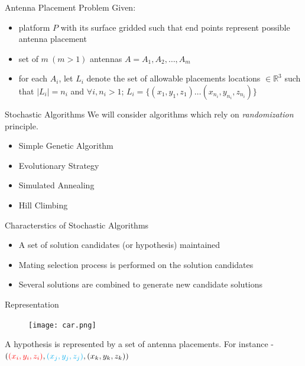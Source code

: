 \documentclass{beamer}
\begin{document}
    \begin{frame}[t]{Antenna Placement Problem}
        Given:
    \begin{itemize} \itemsep1.5em
            \item<1-> platform $P$ with its surface gridded such that end points represent possible antenna placement
            \item<2-> set of  $m~(m > 1)$ antennas $A = {A_1, A_2, \dots, A_m}$
            \item<3-> for each $A_i$, let $L_i$ denote the set of allowable placements locations $\in \mathbb R^3$ such that $\mid L_i \mid = n_i$ and $\forall i, n_i > 1$; $L_i = \{(x_{1}, y_{1}, z_{1}) \dots (x_{n_i}, y_{n_i}, z_{n_i})\}$
        \end{itemize}
        \vspace{10px}
        \centering{}
    \end{frame}

    \begin{frame}[t]{Stochastic Algorithms}
        We will consider algorithms which rely on \textit{randomization} principle.
        \vspace{10px}
    \begin{itemize} \itemsep1.5em
            \item Simple Genetic Algorithm
            \item Evolutionary Strategy
            \item Simulated Annealing
            \item Hill Climbing
        \end{itemize}
    \end{frame}

    \begin{frame}[t]{Characterstics of Stochastic Algorithms}
    \begin{itemize} \itemsep1.5em
            \item A set of solution candidates (or hypothesis) maintained
            \item Mating selection process is performed on the solution candidates
            \item Several solutions are combined to generate new candidate solutions
        \end{itemize}
    \end{frame}



    \begin{frame}[t]{Representation}
        \begin{figure}
            \centering
            \texttt{[image: car.png]}
        \end{figure}
        A hypothesis is represented by a set of antenna placements. For instance - $(\textcolor{red}{(x_i, y_i, z_i)}, \textcolor{cyan}{(x_j, y_j, z_j)}, \textcolor{black}{(x_k, y_k, z_k)})$
    \end{frame}
\end{document}
